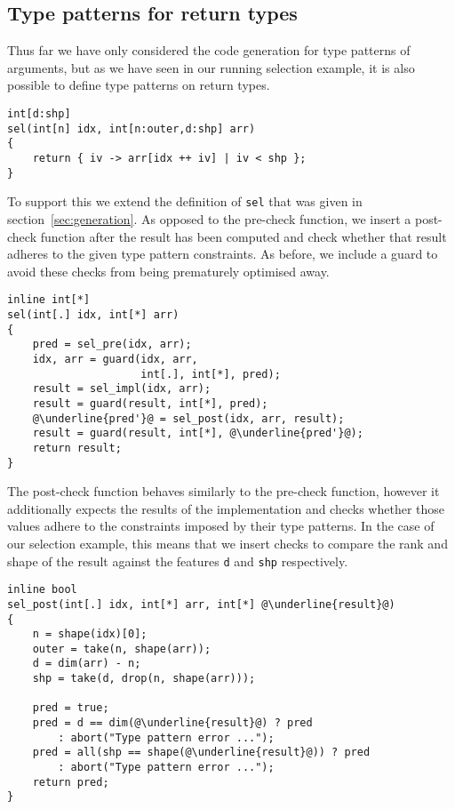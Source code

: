 \subsection{Type patterns for return types}

Thus far we have only considered the code generation for type patterns of arguments, but as we have seen in our running selection example, it is also possible to define type patterns on return types.
\begin{lstlisting}
int[d:shp]
sel(int[n] idx, int[n:outer,d:shp] arr)
{
    return { iv -> arr[idx ++ iv] | iv < shp };
}
\end{lstlisting}

\noindent
To support this we extend the definition of \texttt{sel} that was given in section~\ref{sec:generation}.
As opposed to the pre-check function, we insert a post-check function after the result has been computed and check whether that result adheres to the given type pattern constraints.
As before, we include a guard to avoid these checks from being prematurely optimised away.
\begin{lstlisting}[escapechar=@]
inline int[*]
sel(int[.] idx, int[*] arr)
{
    pred = sel_pre(idx, arr);
    idx, arr = guard(idx, arr,
                     int[.], int[*], pred);
    result = sel_impl(idx, arr);
    result = guard(result, int[*], pred);
    @\underline{pred'}@ = sel_post(idx, arr, result);
    result = guard(result, int[*], @\underline{pred'}@);
    return result;
}
\end{lstlisting}

\noindent
The post-check function behaves similarly to the pre-check function, however it additionally expects the results of the implementation and checks whether those values adhere to the constraints imposed by their type patterns.
In the case of our selection example, this means that we insert checks to compare the rank and shape of the result against the features \texttt{d} and \texttt{shp} respectively.
\begin{lstlisting}[escapechar=@]
inline bool
sel_post(int[.] idx, int[*] arr, int[*] @\underline{result}@)
{
    n = shape(idx)[0];
    outer = take(n, shape(arr));
    d = dim(arr) - n;
    shp = take(d, drop(n, shape(arr)));

    pred = true;
    pred = d == dim(@\underline{result}@) ? pred
        : abort("Type pattern error ...");
    pred = all(shp == shape(@\underline{result}@)) ? pred
        : abort("Type pattern error ...");
    return pred;
}
\end{lstlisting}

